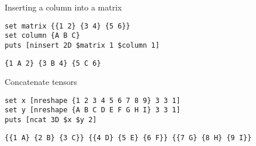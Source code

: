 \documentclass{article}
\begin{document}
\begin{example}{Inserting a column into a matrix}
\begin{lstlisting}
set matrix {{1 2} {3 4} {5 6}}
set column {A B C}
puts [ninsert 2D $matrix 1 $column 1]
\end{lstlisting}
\tcblower
\begin{lstlisting}
{1 A 2} {3 B 4} {5 C 6}
\end{lstlisting}
\end{example}
\begin{example}{Concatenate tensors}
\begin{lstlisting}
set x [nreshape {1 2 3 4 5 6 7 8 9} 3 3 1]
set y [nreshape {A B C D E F G H I} 3 3 1]
puts [ncat 3D $x $y 2]
\end{lstlisting}
\tcblower
\begin{lstlisting}
{{1 A} {2 B} {3 C}} {{4 D} {5 E} {6 F}} {{7 G} {8 H} {9 I}}
\end{lstlisting}
\end{example}

\clearpage
\end{document}
